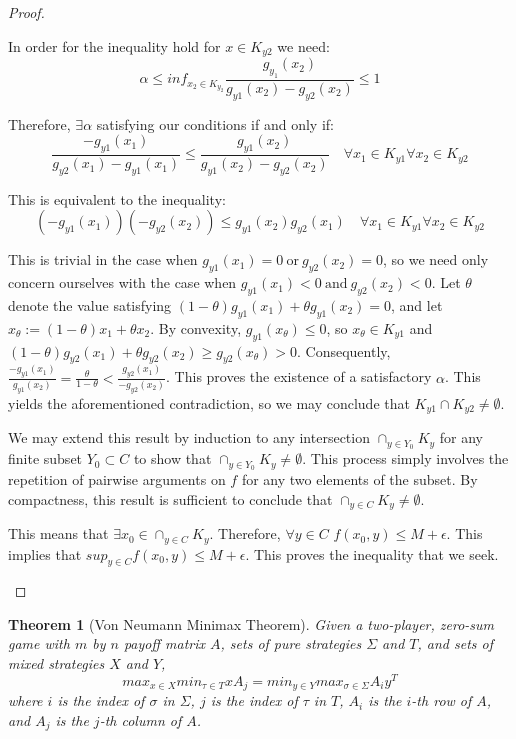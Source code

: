 \documentclass[12pt]{article}
\newtheorem{theorem}{Theorem}[section]
\theoremstyle{definition}
\theoremstyle{remark}
\begin{document}
\begin{proof}
\begin{itemize}
{		In order for the inequality hold for $x \in K_{y2}$ we need:
		\[
			\alpha \leq inf_{x_2 \in K_{y_2}} \frac{g_{y_1}(x_2)}{g_{y1}(x_2) - g_{y2}(x_2)} \leq 1
		\]

		Therefore, $\exists \alpha$ satisfying our conditions if and only if:
		\[
			\frac{-g_{y1}(x_1)}{g_{y2}(x_1) - g_{y1}(x_1)} \leq \frac{g_{y1}(x_2)}{g_{y1}(x_2) - g_{y2}(x_2)} \quad \forall x_1 \in K_{y1} \forall x_2 \in K_{y2}
		\]

		This is equivalent to the inequality:
		\[
			(-g_{y1}(x_1))(-g_{y2}(x_2)) \leq g_{y1}(x_2)g_{y2}(x_1) \quad \forall x_1 \in K_{y1} \forall x_2 \in K_{y2}
		\]

		This is trivial in the case when $g_{y1}(x_1) = 0\ \textrm{or}\ g_{y2}(x_2) = 0$, so we need only concern ourselves with the case when $g_{y1}(x_1) < 0\ \textrm{and}\ g_{y2}(x_2) < 0$. Let $\theta$ denote the value satisfying $(1-\theta)g_{y1}(x_1) + \theta g_{y1}(x_2) = 0$, and let
		$x_\theta := (1-\theta) x_1 + \theta x_2$. By convexity, $g_{y1}(x_\theta) \leq 0$, so $x_\theta \in K_{y1}$ and $(1-\theta)g_{y2}(x_1) + \theta g_{y2}(x_2) \geq g_{y2}(x_\theta) > 0$. Consequently, $\frac{-g_{y1}(x_1)}{g_{y1}(x_2)} = \frac{\theta}{1-\theta} < \frac{g_{y2}(x_1)}{-g_{y2}(x_2)}$.
		This proves the existence of a satisfactory $\alpha$. This yields the aforementioned contradiction, so we may conclude that $K_{y1} \cap K_{y2} \neq \emptyset$.

		We may extend this result by induction to any intersection $\cap_{y \in Y_0}K_y$ for any finite subset $Y_0 \subset C$ to show that $\cap_{y \in Y_0}K_y \neq \emptyset$. This process simply involves the repetition of pairwise arguments on $f$ for any two elements of the subset. By compactness,
		this result is sufficient to conclude that $\cap_{y \in C} K_y \neq \emptyset$.

		This means that $\exists x_0 \in \cap_{y \in C} K_y$. Therefore, $\forall y \in C$ $f(x_0,y) \leq M + \epsilon$. This implies that $sup_{y \in C} f(x_0 , y) \leq M + \epsilon$. This proves the inequality that we seek.
	}
\end{itemize}
\end{proof}

\begin{theorem}[Von Neumann Minimax Theorem]
Given a two-player, zero-sum game with $m$ by $n$ payoff matrix $A$, sets of pure strategies $\Sigma$ and $T$, and sets of mixed strategies $X$ and $Y$,
\[max_{x \in X} min_{\tau \in T} xA_j = min_{y \in Y} max_{\sigma \in \Sigma} A_i y^T\]
where $i$ is the index of $\sigma$ in $\Sigma$, $j$ is the index of $\tau$ in $T$, $A_i$ is the $i$-th row of $A$, and $A_j$ is the $j$-th column of $A$.
\end{theorem}
\end{document}
